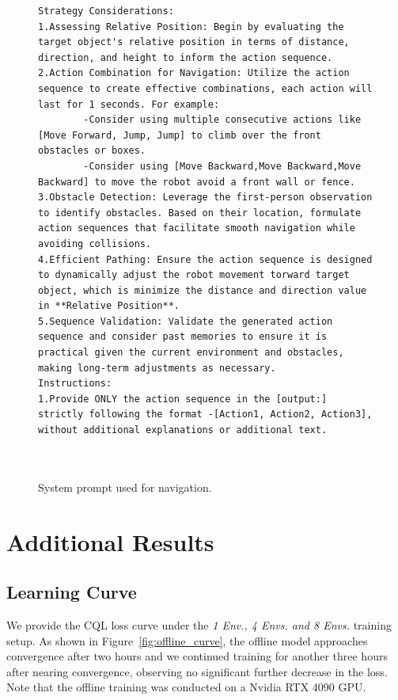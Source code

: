 \begin{figure}[tbhp]
\begin{tcolorbox}[title=System Prompt used for navigation]
\begin{lstlisting}[texcl=true, escapechar=|]
Strategy Considerations:
1.Assessing Relative Position: Begin by evaluating the target object's relative position in terms of distance, direction, and height to inform the action sequence.
2.Action Combination for Navigation: Utilize the action sequence to create effective combinations, each action will last for 1 seconds. For example:
        -Consider using multiple consecutive actions like [Move Forward, Jump, Jump] to climb over the front obstacles or boxes.
        -Consider using [Move Backward,Move Backward,Move Backward] to move the robot avoid a front wall or fence. 
3.Obstacle Detection: Leverage the first-person observation to identify obstacles. Based on their location, formulate action sequences that facilitate smooth navigation while avoiding collisions.
4.Efficient Pathing: Ensure the action sequence is designed to dynamically adjust the robot movement torward target object, which is minimize the distance and direction value in **Relative Position**. 
5.Sequence Validation: Validate the generated action sequence and consider past memories to ensure it is practical given the current environment and obstacles, making long-term adjustments as necessary.
Instructions: 
1.Provide ONLY the action sequence in the [output:] strictly following the format -[Action1, Action2, Action3], without additional explanations or additional text.

    
\end{lstlisting}
\end{tcolorbox}
  \caption{System prompt used for navigation.}
    \label{app:prompt_navigation}
\end{figure}

\newpage
\vspace{-0.4cm}
\section{Additional Results}
\label{app:res}
\vspace{-0.2cm}
\subsection{Learning Curve}
\label{app:curve}
 We provide the CQL loss curve under the \textit{1 Env., 4 Envs. and 8 Envs.} training setup. As shown in Figure~\ref{fig:offline_curve}, the offline model approaches convergence after two hours and we continued training for another three hours after nearing convergence, observing no significant further decrease in the loss. Note that the offline training was conducted on a Nvidia RTX 4090 GPU.

